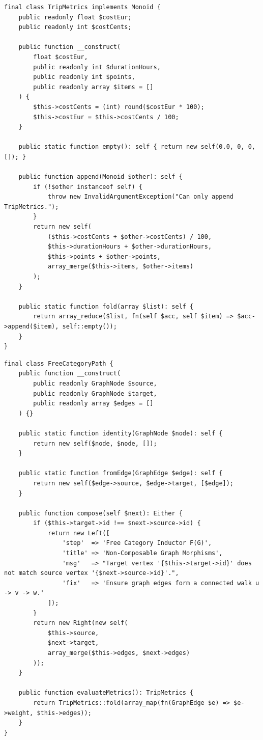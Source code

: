 \begin{lstlisting}[caption={\texttt{TripMetrics} -- fixed, cent-exact \texttt{append}},label={lst:app-monoid},firstnumber=122]
final class TripMetrics implements Monoid {
    public readonly float $costEur;
    public readonly int $costCents;

    public function __construct(
        float $costEur,
        public readonly int $durationHours,
        public readonly int $points,
        public readonly array $items = []
    ) {
        $this->costCents = (int) round($costEur * 100);
        $this->costEur = $this->costCents / 100;
    }

    public static function empty(): self { return new self(0.0, 0, 0, []); }

    public function append(Monoid $other): self {
        if (!$other instanceof self) {
            throw new InvalidArgumentException("Can only append TripMetrics.");
        }
        return new self(
            ($this->costCents + $other->costCents) / 100,
            $this->durationHours + $other->durationHours,
            $this->points + $other->points,
            array_merge($this->items, $other->items)
        );
    }

    public static function fold(array $list): self {
        return array_reduce($list, fn(self $acc, self $item) => $acc->append($item), self::empty());
    }
}
\end{lstlisting}

\begin{lstlisting}[caption={\texttt{FreeCategoryPath} -- composition in $F(G)$, unchanged},label={lst:app-path},firstnumber=183]
final class FreeCategoryPath {
    public function __construct(
        public readonly GraphNode $source,
        public readonly GraphNode $target,
        public readonly array $edges = []
    ) {}

    public static function identity(GraphNode $node): self {
        return new self($node, $node, []);
    }

    public static function fromEdge(GraphEdge $edge): self {
        return new self($edge->source, $edge->target, [$edge]);
    }

    public function compose(self $next): Either {
        if ($this->target->id !== $next->source->id) {
            return new Left([
                'step'  => 'Free Category Inductor F(G)',
                'title' => 'Non-Composable Graph Morphisms',
                'msg'   => "Target vertex '{$this->target->id}' does not match source vertex '{$next->source->id}'.",
                'fix'   => 'Ensure graph edges form a connected walk u -> v -> w.'
            ]);
        }
        return new Right(new self(
            $this->source,
            $next->target,
            array_merge($this->edges, $next->edges)
        ));
    }

    public function evaluateMetrics(): TripMetrics {
        return TripMetrics::fold(array_map(fn(GraphEdge $e) => $e->weight, $this->edges));
    }
}
\end{lstlisting}

